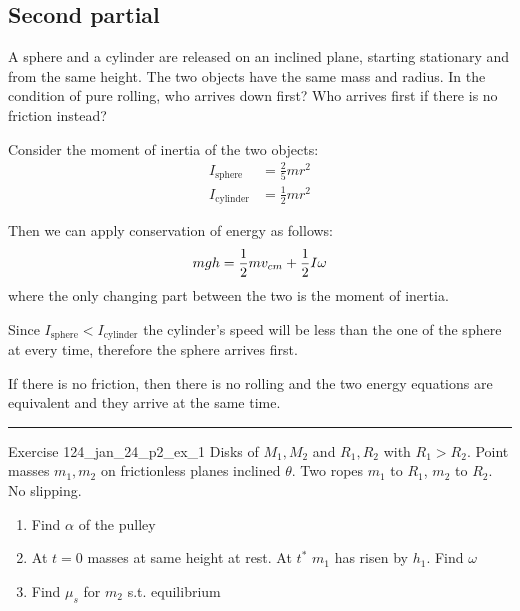 \documentclass[10pt]{extarticle}
\begin{document}
\subsection{Second partial}

\begin{question}{}{}
    A sphere and a cylinder are released on an inclined plane, starting stationary and from the same height.
    The two objects have the same mass and radius.
    In the condition of pure rolling, who arrives down first? Who arrives first if there is no friction instead?
\end{question}

\begin{solution}
    Consider the moment of inertia of the two objects:
    \begin{align*}
        I_\text{sphere}   & = \frac{2}{5} m r^2 \\
        I_\text{cylinder} & = \frac{1}{2}mr^2
    \end{align*}

    Then we can apply conservation of energy as follows:
    \begin{equation}
        mgh = \frac{1}{2} mv_{cm} + \frac{1}{2} I \omega
    \end{equation}
    where the only changing part between the two is the moment of inertia.

    Since $I_\text{sphere} < I_\text{cylinder}$ the cylinder's speed will be less than the one of the sphere at every time, therefore the sphere arrives first.

    If there is no friction, then there is no rolling and the two energy equations are equivalent and they arrive at the same time.
\end{solution}

\noindent\rule{\textwidth}{1pt}

\begin{question}{Exercise 1}{24_jan_24_p2_ex_1}
    Disks of $M_1, M_2$ and $R_1, R_2$ with $R_1 > R_2$. Point masses $m_1, m_2$ on frictionless planes inclined $\theta$.
    Two ropes $m_1$ to $R_1$, $m_2$ to $R_2$. No slipping.

    \begin{enumerate}
        \item Find $\alpha$ of the pulley
        \item At $t=0$ masses at same height at rest. At $t^*$ $m_1$ has risen by $h_1$. Find $\omega$
        \item Find $\mu_s$ for $m_2$ s.t. equilibrium
    \end{enumerate}
\end{question}
\end{document}

